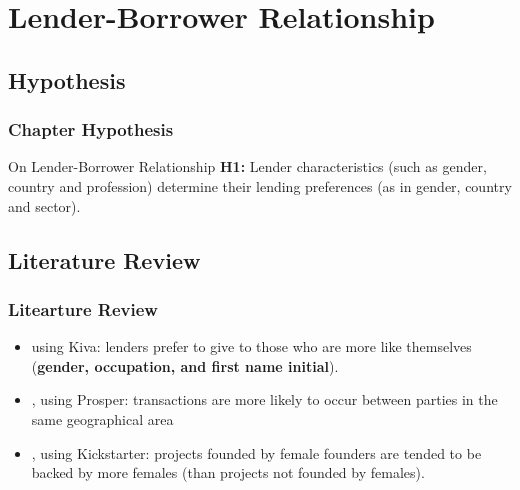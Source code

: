\documentclass{beamer}
\begin{document}
\section{Lender-Borrower Relationship}

\subsection{Hypothesis}
\begin{frame}\frametitle{Chapter Hypothesis}
\begin{block}{On Lender-Borrower Relationship}
\textbf{H1:} Lender characteristics (such as gender, country and profession) determine their lending preferences (as in gender, country and sector).
\end{block}
\end{frame}

\subsection{Literature Review}
\begin{frame}\frametitle{Litearture Review}
\begin{itemize}
\item \textcite{Galak2010} using Kiva: lenders prefer to give to those who are more like themselves (\textbf{gender, occupation, and first name initial}).
\item \textcite{Lin2013}, using Prosper: transactions are more likely to occur between parties in the same geographical area
\item \textcite{Greenberg2015}, using Kickstarter: projects founded by female founders are tended to be backed by more females (than projects not founded by females).
\end{itemize}
\end{frame}
\end{document}
